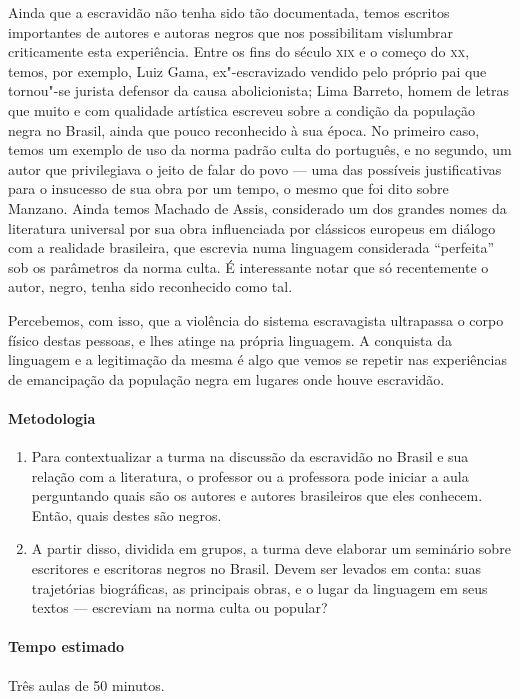 \documentclass[11pt]{extarticle}
\begin{document}
Ainda que a escravidão não tenha sido tão documentada, temos escritos
importantes de autores e autoras negros que nos possibilitam vislumbrar criticamente
esta experiência. Entre os fins do século \textsc{xix} e o começo do \textsc{xx}, temos, por exemplo, Luiz
Gama, ex"-escravizado vendido pelo próprio pai que tornou"-se jurista
defensor da causa abolicionista; Lima Barreto, homem de letras que muito e com qualidade
artística escreveu sobre a condição da população negra no Brasil, ainda que pouco reconhecido
à sua época. No primeiro caso, temos um exemplo de uso da norma padrão culta do português,
e no segundo, um autor que privilegiava o jeito de falar do povo --- uma das possíveis
justificativas para o insucesso de sua obra por um tempo, o mesmo que foi
dito sobre Manzano. Ainda temos Machado de Assis, considerado um dos grandes nomes
da literatura universal por sua obra influenciada por clássicos europeus em diálogo
com a realidade brasileira, que escrevia numa linguagem considerada ``perfeita''
sob os parâmetros da norma culta. É interessante notar que só recentemente
o autor, negro, tenha sido reconhecido como tal. 

Percebemos, com isso, que a violência do sistema escravagista ultrapassa o corpo
físico destas pessoas, e lhes atinge na própria linguagem. A conquista da linguagem
e a legitimação da mesma é algo que vemos se repetir nas experiências de emancipação da
população negra em lugares onde houve escravidão.

\paragraph{Metodologia}

\begin{enumerate}
  \item
  Para contextualizar a turma na discussão da escravidão no Brasil e sua relação com
  a literatura, o professor ou a professora pode iniciar a aula perguntando 
  quais são os autores e autores brasileiros que eles conhecem. Então, quais destes
  são negros.

  \item
  A partir disso, dividida em grupos, a turma deve elaborar um seminário sobre escritores
  e escritoras negros no Brasil. Devem ser levados em conta: suas trajetórias biográficas,
  as principais obras, e o lugar da linguagem em seus textos --- escreviam na norma culta
  ou popular? 
\end{enumerate}

  \paragraph{Tempo estimado} Três aulas de 50 minutos.
\end{document}
